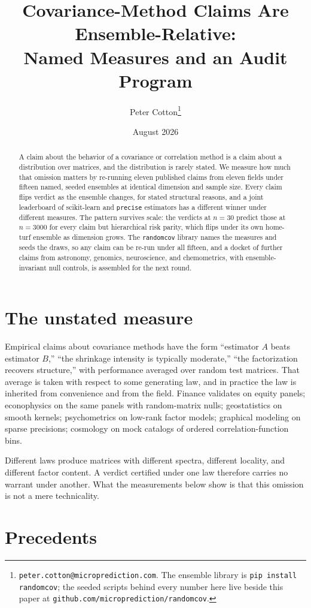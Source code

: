 \documentclass[11pt]{article}
\title{Covariance-Method Claims Are Ensemble-Relative:\\
Named Measures and an Audit Program}
\author{Peter Cotton\thanks{\texttt{peter.cotton@microprediction.com}. The
ensemble library is \texttt{pip install randomcov}; the seeded scripts behind
every number here live beside this paper at
\texttt{github.com/microprediction/randomcov}.}}
\date{August 2026}
\begin{document}
\maketitle

\begin{abstract}
A claim about the behavior of a covariance or correlation method is a
claim about a distribution over matrices, and the distribution is rarely
stated. We measure how much that omission matters by re-running eleven
published claims from eleven fields under fifteen named, seeded
ensembles at identical dimension and sample size. Every claim flips
verdict as the ensemble changes, for stated structural reasons, and a
joint leaderboard of scikit-learn and \texttt{precise} estimators has a
different winner under different measures. The pattern survives scale:
the verdicts at $n=30$ predict those at $n=3000$ for every claim but
hierarchical risk parity, which flips under its own home-turf ensemble
as dimension grows. The \texttt{randomcov} library names the measures
and seeds the draws, so any claim can be re-run under all fifteen, and a
docket of further claims from astronomy, genomics, neuroscience, and
chemometrics, with ensemble-invariant null controls, is assembled for
the next round.
\end{abstract}

\section{The unstated measure}

Empirical claims about covariance methods have the form ``estimator $A$
beats estimator $B$,'' ``the shrinkage intensity is typically moderate,''
``the factorization recovers structure,'' with performance averaged over
random test matrices. That average is taken with respect to some
generating law, and in practice the law is inherited from convenience and
from the field. Finance validates on equity panels;
econophysics on the same panels with random-matrix nulls; geostatistics
on smooth kernels; psychometrics on low-rank factor models; graphical
modeling on sparse precisions; cosmology on mock catalogs of ordered
correlation-function bins.

Different laws produce matrices with different spectra, different
locality, and different factor content. A verdict certified under one law
therefore carries no warrant under another. What
the measurements below show is that this omission is not a mere
technicality.

\section{Precedents}
\end{document}
